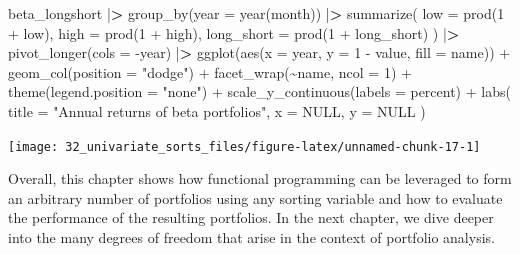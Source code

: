 \documentclass[
]{book}
\newenvironment{Shaded}{\begin{snugshade}}{\end{snugshade}}
\newcommand{\AttributeTok}[1]{\textcolor[rgb]{0.61,0.61,0.61}{#1}}
\newcommand{\ConstantTok}[1]{\textcolor[rgb]{0,0,0}{#1}}
\newcommand{\DecValTok}[1]{\textcolor[rgb]{0.06,0.06,0.06}{#1}}
\newcommand{\ErrorTok}[1]{\textcolor[rgb]{0.14,0.14,0.14}{\textbf{#1}}}
\newcommand{\FunctionTok}[1]{\textcolor[rgb]{0,0,0}{#1}}
\newcommand{\NormalTok}[1]{#1}
\newcommand{\SpecialCharTok}[1]{\textcolor[rgb]{0,0,0}{#1}}
\newcommand{\StringTok}[1]{\textcolor[rgb]{0.5,0.5,0.5}{#1}}
\begin{document}
\begin{Shaded}
\begin{Highlighting}[]
\NormalTok{beta\_longshort }\SpecialCharTok{|}\ErrorTok{\textgreater{}}
  \FunctionTok{group\_by}\NormalTok{(}\AttributeTok{year =} \FunctionTok{year}\NormalTok{(month)) }\SpecialCharTok{|}\ErrorTok{\textgreater{}}
  \FunctionTok{summarize}\NormalTok{(}
    \AttributeTok{low =} \FunctionTok{prod}\NormalTok{(}\DecValTok{1} \SpecialCharTok{+}\NormalTok{ low),}
    \AttributeTok{high =} \FunctionTok{prod}\NormalTok{(}\DecValTok{1} \SpecialCharTok{+}\NormalTok{ high),}
    \AttributeTok{long\_short =} \FunctionTok{prod}\NormalTok{(}\DecValTok{1} \SpecialCharTok{+}\NormalTok{ long\_short)}
\NormalTok{  ) }\SpecialCharTok{|}\ErrorTok{\textgreater{}}
  \FunctionTok{pivot\_longer}\NormalTok{(}\AttributeTok{cols =} \SpecialCharTok{{-}}\NormalTok{year) }\SpecialCharTok{|}\ErrorTok{\textgreater{}}
  \FunctionTok{ggplot}\NormalTok{(}\FunctionTok{aes}\NormalTok{(}\AttributeTok{x =}\NormalTok{ year, }\AttributeTok{y =} \DecValTok{1} \SpecialCharTok{{-}}\NormalTok{ value, }\AttributeTok{fill =}\NormalTok{ name)) }\SpecialCharTok{+}
  \FunctionTok{geom\_col}\NormalTok{(}\AttributeTok{position =} \StringTok{"dodge"}\NormalTok{) }\SpecialCharTok{+}
  \FunctionTok{facet\_wrap}\NormalTok{(}\SpecialCharTok{\textasciitilde{}}\NormalTok{name, }\AttributeTok{ncol =} \DecValTok{1}\NormalTok{) }\SpecialCharTok{+}
  \FunctionTok{theme}\NormalTok{(}\AttributeTok{legend.position =} \StringTok{"none"}\NormalTok{) }\SpecialCharTok{+}
  \FunctionTok{scale\_y\_continuous}\NormalTok{(}\AttributeTok{labels =}\NormalTok{ percent) }\SpecialCharTok{+}
  \FunctionTok{labs}\NormalTok{(}
    \AttributeTok{title =} \StringTok{"Annual returns of beta portfolios"}\NormalTok{,}
    \AttributeTok{x =} \ConstantTok{NULL}\NormalTok{, }\AttributeTok{y =} \ConstantTok{NULL}
\NormalTok{  )}
\end{Highlighting}
\end{Shaded}

\begin{center}\texttt{[image: 32\_univariate\_sorts\_files/figure-latex/unnamed-chunk-17-1]} \end{center}

Overall, this chapter shows how functional programming can be leveraged to form an arbitrary number of portfolios using any sorting variable and how to evaluate the performance of the resulting portfolios. In the next chapter, we dive deeper into the many degrees of freedom that arise in the context of portfolio analysis.
\end{document}
